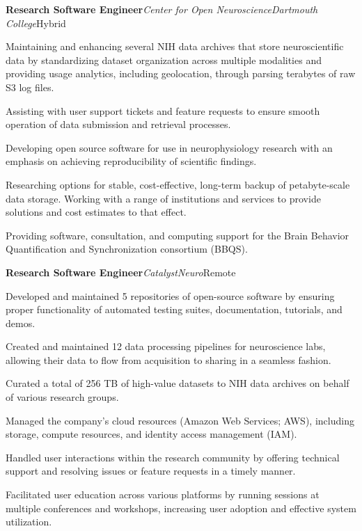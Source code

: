 \begin{rubric}{}
%
%
%
%
%
%
\entry*[2025 -- Present]
    \textbf{Research Software Engineer}\cvbar \emph{Center for Open Neuroscience}\cvbar \emph{Dartmouth College}\cvbar Hybrid
\begin{cvitems}
\item Maintaining and enhancing several NIH data archives that store neuroscientific data by standardizing dataset organization across multiple modalities and providing usage analytics, including geolocation, through parsing terabytes of raw S3 log files.
\item Assisting with user support tickets and feature requests to ensure smooth operation of data submission and retrieval processes.
\item Developing open source software for use in neurophysiology research with an emphasis on achieving reproducibility of scientific findings.
\item Researching options for stable, cost-effective, long-term backup of petabyte-scale data storage. Working with a range of institutions and services to provide solutions and cost estimates to that effect.
\item Providing software, consultation, and computing support for the Brain Behavior Quantification and Synchronization consortium (BBQS).
\end{cvitems}
%
%
%
\entry*[2020 -- 2024]
    \textbf{Research Software Engineer}\cvbar \emph{CatalystNeuro}\cvbar Remote
\begin{cvitems}
\item Developed and maintained 5 repositories of open-source software by ensuring proper functionality of automated testing suites, documentation, tutorials, and demos.
\item Created and maintained 12\raisebox{.3ex}{\scriptsize +} data processing pipelines for neuroscience labs, allowing their data to flow from acquisition to sharing in a seamless fashion.
\item Curated a total of 256 TB of high-value datasets to NIH data archives on behalf of various
research groups.
\item Managed the company's cloud resources (Amazon Web Services; AWS), including storage, compute resources, and
identity access management (IAM).
\item Handled user interactions within the research community by offering technical support and resolving issues or feature requests in a timely manner.
\item Facilitated user education across various platforms by running sessions at multiple conferences and workshops, increasing user adoption and effective system utilization.

\end{cvitems}
\end{rubric}

